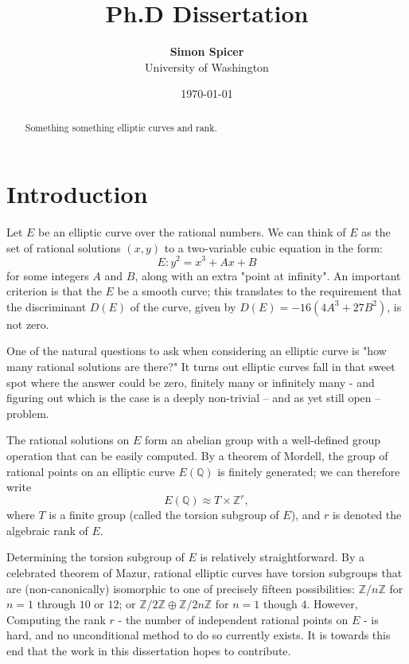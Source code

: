 \documentclass[10pt]{article}
\title{Ph.D Dissertation}
\author{{\bf Simon Spicer} \\ University of Washington}
\date{\today}
\begin{document}
\maketitle

\begin{abstract}
Something something elliptic curves and rank.
\end{abstract}

\newpage
\tableofcontents

\newpage
\section{Introduction}

Let $E$ be an elliptic curve over the rational numbers. We can think of $E$ as the set of rational solutions $(x,y)$ to a two-variable cubic equation in the form:
\begin{equation}
E: y^2 = x^3 + Ax + B
\end{equation}
for some integers $A$ and $B$, along with an extra "point at infinity". An important criterion is that the $E$ be a smooth curve; this translates to the requirement that the discriminant $D(E)$ of the curve, given by $D(E) = -16(4A^3+27B^2)$, is not zero.

One of the natural questions to ask when considering an elliptic curve is "how many rational solutions are there?" It turns out elliptic curves fall in that sweet spot where the answer could be zero, finitely many or infinitely many - and figuring out which is the case is a deeply non-trivial -- and as yet still open -- problem.

The rational solutions on $E$ form an abelian group with a well-defined group operation that can be easily computed. By a theorem of Mordell, the group of rational points on an elliptic curve $E(\mathbb{Q})$ is finitely generated; we can therefore write
\begin{equation}
E(\mathbb{Q}) \approx T \times \mathbb{Z}^r,
\end{equation}
where $T$ is a finite group (called the torsion subgroup of $E$), and $r$ is denoted the algebraic rank of $E$.

Determining the torsion subgroup of $E$ is relatively straightforward. By a celebrated theorem of Mazur, rational elliptic curves have torsion subgroups that are (non-canonically) isomorphic to one of precisely fifteen possibilities: $\mathbb{Z}/n\mathbb{Z}$ for $n = 1$ through $10$ or $12$; or $\mathbb{Z}/2\mathbb{Z}\oplus \mathbb{Z}/2n\mathbb{Z}$ for $n = 1$ though $4$. However, Computing the rank $r$ - the number of independent rational points on $E$ - is hard, and no unconditional method to do so currently exists. It is towards this end that the work in this dissertation hopes to contribute. \\
\end{document}
